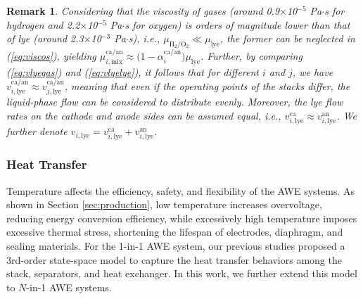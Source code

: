 \documentclass[review,3p,10pt]{elsarticle}
\newtheorem{remark}{Remark}
\begin{document}
\begin{remark}
  \label{remark:1}
  Considering that the viscosity of gases (around 0.9$\times$10$^{-\text{5}}$ Pa$\cdot$s for hydrogen and 2.2$\times$10$^{-\text{5}}$ Pa$\cdot$s for oxygen) is orders of magnitude lower than that of lye (around 2.3$\times$10$^{-\text{3}}$ Pa$\cdot$s), i.e., $\mu_{\text{H}_2/\text{O}_2} \ll \mu_{\text{lye}}$, the former can be neglected in (\ref{eq:viscos}), yielding $\mu_{i,\text{mix}}^{\text{ca/an}} \approx \big( 1-\alpha_i^{\text{ca/an}}\big) \mu_{\text{lye}} $.
  Further, by comparing (\ref{eq:vlyegas}) and (\ref{eq:vlyelye}), it follows that for different $i$ and $j$, we have $v_{i,\text{lye}}^{\text{ca/an}} \approx v_{j,\text{lye}}^{\text{ca/an}}$, meaning that even if the operating points of the stacks differ, the liquid-phase flow can be considered to distribute evenly.
  Moreover, the lye flow rates on the cathode and anode sides can be assumed equal, i.e., $v_{i,\text{lye}}^{\text{ca}} \approx v_{i,\text{lye}}^{\text{an}}$. We further denote $v_{i,\text{lye}} = v_{i,\text{lye}}^{\text{ca}} + v_{i,\text{lye}}^{\text{an}}$. %
\end{remark}

\subsubsection{Heat Transfer}
\label{sec:thermal}

Temperature affects the efficiency, safety, and flexibility of the AWE systems. As shown in Section \ref{sec:production}, low temperature increases overvoltage, reducing energy conversion efficiency, while excessively high temperature imposes excessive thermal stress, shortening the lifespan of electrodes, diaphragm, and sealing materials. For the 1-in-1 AWE system, our previous studies \cite{qi2023thermal}
proposed a 3rd-order state-space model to capture the heat transfer behaviors among the stack, separators, and heat exchanger. In this work, we further extend this model to $N$-in-1 AWE systems.
\end{document}
